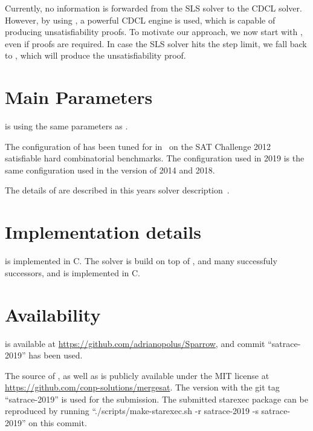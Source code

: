 \documentclass[conference]{IEEEtran}
\def\CC{{C\nolinebreak[4]\hspace{-.05em}\raisebox{.4ex}{\tiny\bf ++}}}
\begin{document}
Currently, no information is forwarded from the SLS solver to the CDCL solver.
However, by using \mergesat, a powerful CDCL engine is used, which is capable of producing unsatisfiability proofs.
To motivate our approach, we now start with \scp, even if proofs are required. In case the SLS solver hits the step limit, we fall back to \mergesat, which will produce the unsatisfiability proof.

\section{Main Parameters}
\sparrow is using the same parameters as . 

The configuration of \cpt has been tuned for \sparrow in~\cite{bm-pos-2013} on the SAT Challenge 2012 satisfiable hard combinatorial benchmarks.
The configuration used in 2019 is the same configuration used in the version of 2014 and 2018.

The details of \mergesat are described in this years solver description~\cite{mergesat2019}.

% 
\section{Implementation details}

\sparrow is implemented in C.
%
The solver \mergesat is build on top of \minisat, and many successfuly successors, and is implemented in \CC.
 
\section{Availability}

\sparrow is available at \url{https://github.com/adrianopolus/Sparrow}, and commit ``satrace-2019'' has been used.

The source of \mergesat, as well as \stm is publicly available under the MIT license at \url{https://github.com/conp-solutions/mergesat}.
The version with the git tag ``satrace-2019'' is used for the submission.
The submitted starexec package can be reproduced by running ``./scripts/make-starexec.sh -r satrace-2019 -s satrace-2019'' on this commit.



\end{document}
